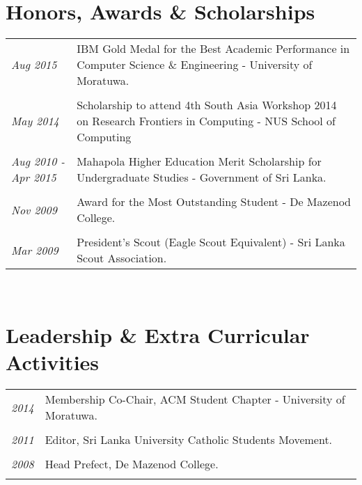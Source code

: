 \documentclass[a4paper,10pt]{article}
\begin{document}
\section{Honors, Awards \& Scholarships}
\begin{tabular}{p{3cm}|p{13.5cm}}
\emph{Aug 2015} & IBM Gold Medal for the Best Academic Performance in Computer Science \& Engineering - University of Moratuwa.\\\\
\emph{May 2014} & Scholarship to attend 4th South Asia Workshop 2014 on Research Frontiers in Computing - NUS School of Computing\\\\
\emph{Aug 2010 - Apr 2015} & Mahapola Higher Education Merit Scholarship for Undergraduate Studies - Government of Sri Lanka.\\\\
\emph{Nov 2009} & Award for the Most Outstanding Student - De Mazenod College.\\\\
\emph{Mar 2009} & President’s Scout (Eagle Scout Equivalent) - Sri Lanka Scout Association.\\
\end{tabular}\\

\section{Leadership \& Extra Curricular Activities}
\begin{tabular}{p{3cm}|p{13.5cm}}
\emph{2014} & Membership Co-Chair, ACM Student Chapter - University of Moratuwa.\\\\

\emph{2011} & Editor, Sri Lanka University Catholic Students Movement.\\\\
\emph{2008} & Head Prefect, De Mazenod College.\\\\
\end{tabular}\\
\end{document}
